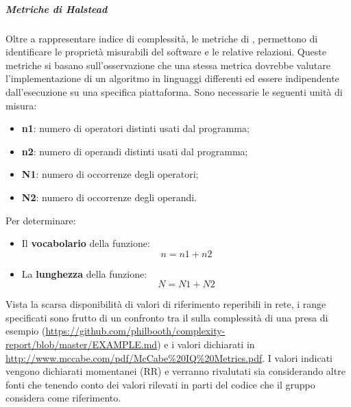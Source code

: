 \documentclass[../PianoDiQualifica.tex]{subfiles}
\begin{document}
			\subparagraph{Metriche di Halstead}
			Oltre a rappresentare indice di complessità, le metriche di  , permettono di identificare le proprietà misurabili del software e le relative relazioni. Queste metriche si basano sull'osservazione che una stessa metrica dovrebbe valutare l'implementazione di un algoritmo in linguaggi differenti ed essere indipendente dall'esecuzione su una specifica piattaforma.
				Sono necessarie le seguenti unità di misura:
				\begin{itemize}
					\item \textbf{n1}: numero di operatori distinti usati dal programma;
					\item \textbf{n2}: numero di operandi distinti usati dal programma;
					\item \textbf{N1}: numero di occorrenze degli operatori;
					\item \textbf{N2}: numero di occorrenze degli operandi.
				\end{itemize}
				Per determinare:
				\begin{itemize}
					\item {Il \textbf{vocabolario} della funzione}:
					\begin{equation*}
						n = n1 + n2
					\end{equation*}
					\item {La \textbf{lunghezza} della funzione}:
					\begin{equation*}
						N = N1 + N2
					\end{equation*}
				\end{itemize}
				Vista la scarsa disponibilità di valori di riferimento reperibili in rete, i range specificati sono frutto di un confronto tra il  sulla complessità di una   presa di esempio (\href{https://github.com/philbooth/complexity-report/blob/master/EXAMPLE.md}{https://github.com/philbooth/complexity-report/blob/master/EXAMPLE.md}) e i valori dichiarati in \href{http://www.mccabe.com/pdf/McCabe\%20IQ\%20Metrics.pdf}{http://www.mccabe.com/pdf/McCabe\%20IQ\%20Metrics.pdf}. I valori indicati vengono dichiarati momentanei (RR) e verranno rivalutati sia considerando altre fonti che tenendo conto dei valori rilevati in parti del codice che il gruppo considera come riferimento.\\
\end{document}
